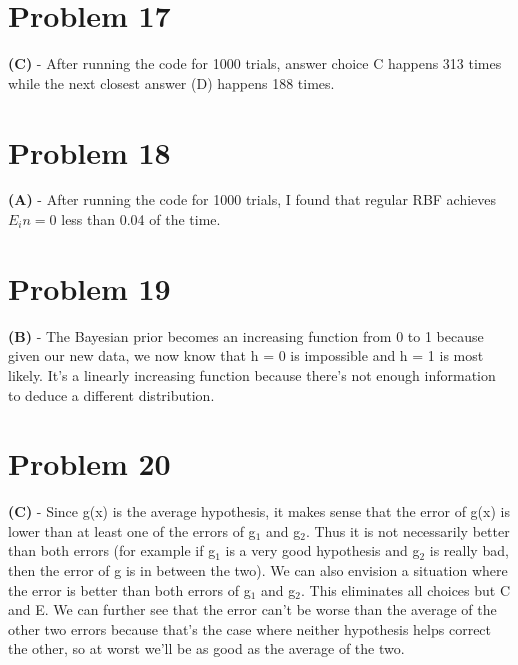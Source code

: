 \documentclass[10pt,letter]{article}
\begin{document}
\section*{Problem 17}

\textbf{(C)} - After running the code for 1000 trials, answer choice C happens 313 times while the next closest answer (D) happens 188 times.

\section*{Problem 18}

\textbf{(A)} - After running the code for 1000 trials, I found that regular RBF achieves $E_in = 0$ less than 0.04 of the time.

\section*{Problem 19}

\textbf{(B)} - The Bayesian prior becomes an increasing function from 0 to 1 because given our new data, we now know that h = 0 is impossible and h = 1 is most likely. It's a linearly increasing function because there's not enough information to deduce a different distribution.

\section*{Problem 20}

\textbf{(C)} - Since g(x) is the average hypothesis, it makes sense that the error of g(x) is lower than at least one of the errors of g$_{1}$ and g$_2$. Thus it is not necessarily better than both errors (for example if g$_1$ is a very good hypothesis and g$_2$ is really bad, then the error of g is in between the two). We can also envision a situation where the error is better than both errors of g$_1$ and g$_2$. This eliminates all choices but C and E. We can further see that the error can't be worse than the average of the other two errors because that's the case where neither hypothesis helps correct the other, so at worst we'll be as good as the average of the two.
\end{document}
